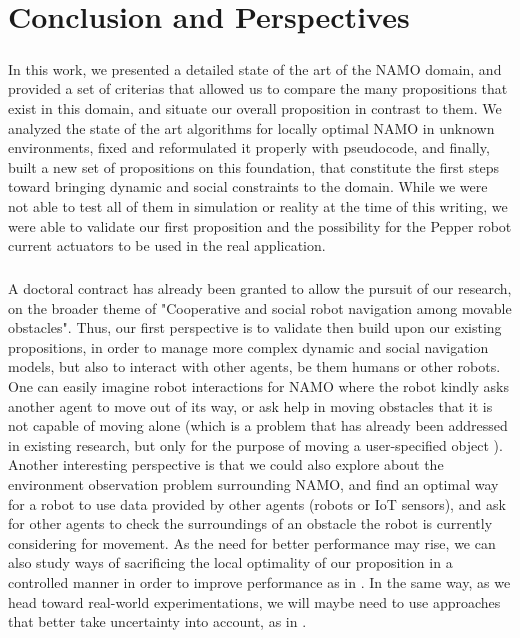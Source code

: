 
\chapter{Conclusion and Perspectives} %

\label{Chapter6} %

\paragraph{} In this work, we presented a detailed state of the art of the NAMO domain, and provided a set of criterias that allowed us to compare the many propositions that exist in this domain, and situate our overall proposition in contrast to them. We analyzed the state of the art algorithms for locally optimal NAMO in unknown environments, fixed and reformulated it properly with pseudocode, and finally, built a new set of propositions on this foundation, that constitute the first steps toward bringing dynamic and social constraints to the domain. While we were not able to test all of them in simulation or reality at the time of this writing, we were able to validate our first proposition and the possibility for the Pepper robot current actuators to be used in the real application.

\paragraph{} A doctoral contract has already been granted to allow the pursuit of our research, on the broader theme of "Cooperative and social robot navigation among movable obstacles". Thus, our first perspective is to validate then build upon our existing propositions, in order to manage more complex dynamic and social navigation models, but also to interact with other agents, be them humans or other robots. One can easily imagine robot interactions for NAMO where the robot kindly asks another agent to move out of its way, or ask help in moving obstacles that it is not capable of moving alone (which is a problem that has already been addressed in existing research, but only for the purpose of moving a user-specified object \parencite{amato_planning_2015}). Another interesting perspective is that we could also explore about the environment observation problem surrounding NAMO, and find an optimal way for a robot to use data provided by other agents (robots or IoT sensors), and ask for other agents to check the surroundings of an obstacle the robot is currently considering for movement. As the need for better performance may rise, we can also study ways of sacrificing the local optimality of our proposition in a controlled manner in order to improve performance as in \parencite{levihn_planning_2013}. In the same way, as we head toward real-world experimentations, we will maybe need to use approaches that better take uncertainty into account, as in \parencite{stilman_planning_2007, levihn_foresight_2013, levihn_planning_2013, scholz_navigation_2016}.

